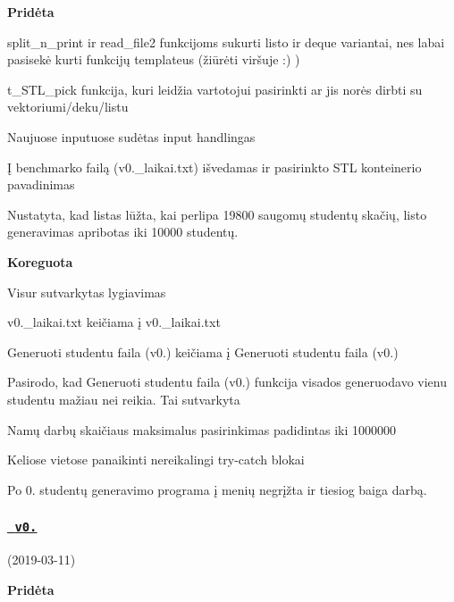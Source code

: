 {\bfseries{Pridėta}}
\begin{DoxyItemize}
\item {\ttfamily split\+\_\+n\+\_\+print} ir {\ttfamily read\+\_\+file2} funkcijoms sukurti listo ir deque variantai, nes labai pasisekė kurti funkcijų template\textquotesingle{}us (žiūrėti viršuje \+:) )
\item {\ttfamily t\+\_\+\+S\+T\+L\+\_\+pick} funkcija, kuri leidžia vartotojui pasirinkti ar jis norės dirbti su vektoriumi/deku/listu
\item Naujuose inputuose sudėtas input handling\textquotesingle{}as
\item Į benchmark\textquotesingle{}o failą (v0.\+\_\+laikai.\+txt) išvedamas ir pasirinkto S\+TL konteinerio pavadinimas
\item Nustatyta, kad listas lūžta, kai perlipa 19800 saugomų studentų skačių, listo generavimas apribotas iki 10000 studentų.
\item 
\end{DoxyItemize}

{\bfseries{Koreguota}}
\begin{DoxyItemize}
\item Visur sutvarkytas lygiavimas
\item {\ttfamily v0.\+\_\+laikai.\+txt} keičiama į {\ttfamily v0.\+\_\+laikai.\+txt}
\item {\ttfamily Generuoti studentu faila (v0.)} keičiama į {\ttfamily Generuoti studentu faila (v0.)}
\item Pasirodo, kad {\ttfamily Generuoti studentu faila (v0.)} funkcija visados generuodavo vienu studentu mažiau nei reikia. Tai sutvarkyta
\item Namų darbų skaičiaus maksimalus pasirinkimas padidintas iki 1000000
\item Keliose vietose panaikinti nereikalingi try-\/catch blokai
\item Po 0. studentų generavimo programa į menių negrįžta ir tiesiog baiga darbą.
\end{DoxyItemize}



 \subsubsection*{\href{https://github.com/gitguuddd/Obj_Duomenu_apdorojimas/releases/tag/v0.4}{\texttt{ v0.}}}

(2019-\/03-\/11) 

{\bfseries{Pridėta}}


